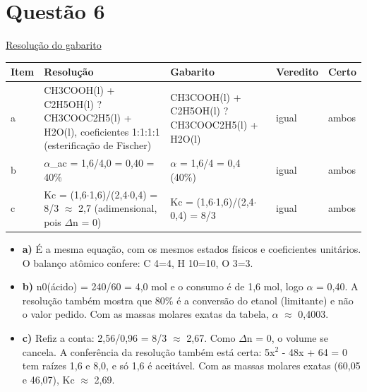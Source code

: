 \documentclass{article}%
\begin{document}
\section*{Questão 6}%
\href{https://poliedroresolve.sistemapoliedro.com.br/vestibulares/ime/2027/ime-2-fase-dia-3-28-10-2026-2-fase-dia-3/dissertativa-6-quimica-2-fase-dia-3-ime-2027}{Resolução do gabarito}\par\smallskip%
\begin{longtable}{@{}p{} p{} p{} p{} p{}@{}}\toprule Item & Resolução & Gabarito & Veredito & Certo \\ \midrule
a & CH3COOH(l) + C2H5OH(l) ? CH3COOC2H5(l) + H2O(l), coeficientes 1:1:1:1 (esterificação de Fischer) & CH3COOH(l) + C2H5OH(l) ? CH3COOC2H5(l) + H2O(l) & igual & ambos \\
b & $\alpha$\_ac = 1,6/4,0 = 0,40 = 40\% & $\alpha$ = 1,6/4 = 0,4 (40\%) & igual & ambos \\
c & Kc = (1,6$\cdot$1,6)/(2,4$\cdot$0,4) = 8/3 $\approx$ 2,7 (adimensional, pois $\Delta$n = 0) & Kc = (1,6$\cdot$1,6)/(2,4$\cdot$0,4) = 8/3 & igual & ambos \\
\bottomrule\end{longtable}%
\begin{itemize}%
\item%
\textbf{a)} É a mesma equação, com os mesmos estados físicos e coeficientes unitários. O balanço atômico confere: C 4=4, H 10=10, O 3=3.%
\item%
\textbf{b)} n0(ácido) = 240/60 = 4,0 mol e o consumo é de 1,6 mol, logo $\alpha$ = 0,40. A resolução também mostra que 80\% é a conversão do etanol (limitante) e não o valor pedido. Com as massas molares exatas da tabela, $\alpha$ $\approx$ 0,4003.%
\item%
\textbf{c)} Refiz a conta: 2,56/0,96 = 8/3 $\approx$ 2,67. Como $\Delta$n = 0, o volume se cancela. A conferência da resolução também está certa: 5x$^2$ - 48x + 64 = 0 tem raízes 1,6 e 8,0, e só 1,6 é aceitável. Com as massas molares exatas (60,05 e 46,07), Kc $\approx$ 2,69.%
\end{itemize}%
\end{document}
